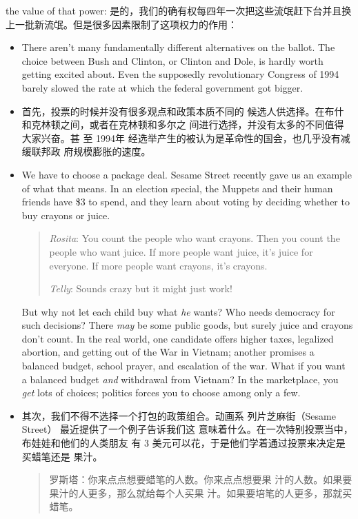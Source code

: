 \begin{paracol}{2}
the value of that power:
\switchcolumn
是的，我们的确有权每四年一次把这些流氓赶下台并且换
上一批新流氓。但是很多因素限制了这项权力的作用：
\switchcolumn*
\begin{itemize}
	\item There aren't many fundamentally different alternatives on
	the ballot. The choice between Bush and Clinton, or Clinton
	and Dole, is hardly worth getting excited about. Even the supposedly revolutionary Congress of 1994 barely slowed the rate
	at which the federal government got bigger.
\end{itemize}
\switchcolumn
\begin{itemize}
	\item 首先，投票的时候并没有很多观点和政策本质不同的
	候选人供选择。在布什和克林顿之间，或者在克林顿和多尔之
	间进行选择，并没有太多的不同值得大家兴奋。甚 至 1994年
	经选举产生的被认为是革命性的国会，也几乎没有减缓联邦政
	府规模膨胀的速度。
\end{itemize}
\switchcolumn*
\begin{itemize}
	\item We have to choose a package deal. Sesame Street recently
	gave us an example of what that means. In an election special,
	the Muppets and their human friends have \$3 to spend, and
	they learn about voting by deciding whether to buy crayons or
	juice.
	\begin{quotation}
		\textit{Rosita}: You count the people who want crayons. Then you count
		the people who want juice. If more people want juice, it's juice
		for everyone. If more people want crayons, it's crayons.
		
		\textit{Telly}: Sounds crazy but it might just work!
	\end{quotation}
	But why not let each child buy what \textit{he} wants? Who needs
	democracy for such decisions? There \textit{may} be some public goods,
	but surely juice and crayons don't count. In the real world, one
	candidate offers higher taxes, legalized abortion, and getting
	out of the War in Vietnam; another promises a balanced budget, school prayer, and escalation of the war. What if you want
	a balanced budget \textit{and} withdrawal from Vietnam? In the marketplace, you \textit{get} lots of choices; politics forces you to choose
	among only a few.
\end{itemize}
\switchcolumn
\begin{itemize}
	\item 其次，我们不得不选择一个打包的政策组合。动画系
	列片芝麻街（Sesame Street） 最近提供了一个例子告诉我们这
	意味着什么。在一次特别投票当中，布娃娃和他们的人类朋友
	有 3 美元可以花，于是他们学着通过投票来决定是买蜡笔还是
	果汁。
	\begin{quotation}
		罗斯塔：你来点点想要蜡笔的人数。你来点点想要果
		汁的人数。如果要果汁的人更多，那么就给每个人买果
		汁。如果要培笔的人更多，那就买蜡笔。
		

\end{quotation}
\end{itemize}
\end{paracol}

